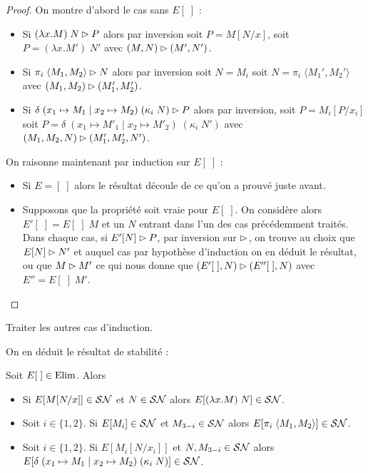\begin{proof}
    On montre d'abord le cas sans $E[\;]$ :
    \begin{itemize}[label=$\bullet$]
        \item Si $(\lambda x.M)\;N\rhd P$ alors par inversion soit $P = M[N/x]$, soit $P = (\lambda x.M')\;N'$ avec $(M,N)\rhd (M',N')$.
        \item Si $\pi_i\;\langle M_1,M_2\rangle\rhd N$ alors par inversion soit $N = M_i$ soit $N = \pi_i\;\langle M_1',M_2'\rangle$ avec $(M_1,M_2)\rhd (M_1',M_2')$.
        \item Si $\delta\;(x_1\mapsto M_1\mid x_2\mapsto M_2)\;(\kappa_i\;N)\rhd P$ alors par inversion, soit $P = M_i[P/x_i]$ soit $P = \delta\;(x_1\mapsto M'_1\mid x_2\mapsto M'_2)\;(\kappa_i\;N')$ avec $(M_1,M_2,N)\rhd (M'_1,M'_2,N')$.
    \end{itemize}
    
    On raisonne maintenant par induction sur $E[\;]$ :
    \begin{itemize}[label=$\bullet$]
        \item Si $E = [\;]$ alors le résultat découle de ce qu'on a prouvé juste avant.
        \item Supposons que la propriété soit vraie pour $E[\;]$. On considère alors $E'[\;] = E[\;]\;M$ et un $N$ entrant dans l'un des cas précédemment traités. Dans chaque cas, si $E'[N]\rhd P$, par inversion sur $\rhd$, on trouve au choix que $E[N] \rhd N'$ et auquel cas par hypothèse d'induction on en déduit le résultat, ou que $M\rhd M'$ ce qui nous donne que $(E'[\;],N)\rhd (E''[\;],N)$ avec $E'' = E[\;]\;M'$.
    \end{itemize}
\end{proof}

\begin{exo}
    Traiter les autres cas d'induction.
\end{exo}

On en déduit le résultat de stabilité :

\begin{prop}
    Soit $E[\;]\in\mathrm{Elim}$. Alors
    \begin{itemize}[label=$\bullet$]
        \item Si $E[M[N/x]]\in \mathcal {SN}$ et $N\in\mathcal {SN}$ alors $E[(\lambda x.M)\;N]\in\mathcal {SN}$.
        \item Soit $i\in\{1,2\}$. Si $E[M_i]\in\mathcal {SN}$ et $M_{3-i}\in\mathcal {SN}$ alors $E[\pi_i\;\langle M_1,M_2\rangle]\in\mathcal {SN}$.
        \item Soit $i\in\{1,2\}$. Si $E[M_i[N/x_i]]$ et $N,M_{3-i}\in\mathcal {SN}$ alors $E[\delta\;(x_1\mapsto M_1\mid x_2\mapsto M_2)\;(\kappa_i\;N)]\in\mathcal {SN}$.
    \end{itemize}
\end{prop}

